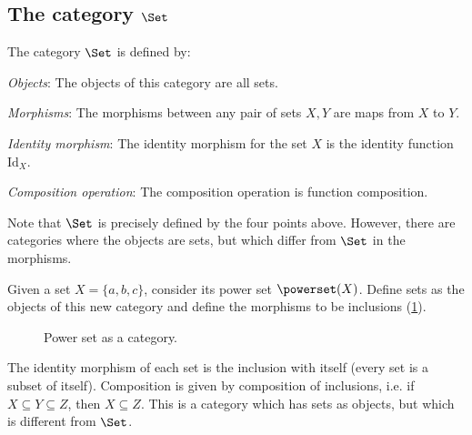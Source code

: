 \subsection{The category $\Set$}


\begin{shaded}
\begin{definition}
    The category $\Set$ is defined by:
    \begin{compactenum}
    \item \emph{Objects}: The objects of this category are all sets.
    \item \emph{Morphisms}: The morphisms between any pair of sets $X, Y$
    are maps from $X$ to $Y$.
    \item \emph{Identity morphism}: The identity morphism for the set $X$
    is the identity function $\text{Id}_X$.
    \item \emph{Composition operation}: The composition operation is function
    composition.
    \end{compactenum}
\end{definition}
\end{shaded}

Note that $\Set$ is precisely defined by the four points above. However, there are categories where the objects are sets, but which differ from $\Set$ in the morphisms.
\begin{example}
\label{ex:hasseinclusion}
Given a set $X=\{a,b,c\}$, consider its power set $\powerset(X)$. Define sets as the objects of this new category and define the morphisms to be inclusions (\cref{fig:powersetcat}).
\begin{figure}[h!]
\begin{center}
\end{center}
\caption{Power set as a category. \label{fig:powersetcat}}
\end{figure}
The identity morphism of each set is the inclusion with itself (every set is a subset of itself). Composition is given by composition of inclusions, i.e. if $X\subseteq Y \subseteq Z$, then $X\subseteq Z$. This is a category which has sets as objects, but which is different from $\Set$.
\end{example}
